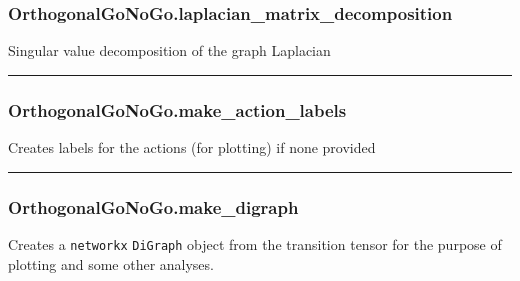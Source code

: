 \subsubsection{OrthogonalGoNoGo.laplacian\_matrix\_decomposition}\label{orthogonalgonogo.laplacian_matrix_decomposition}

\begin{Shaded}
\begin{Highlighting}[]
\NormalTok{)}
\end{Highlighting}
\end{Shaded}

Singular value decomposition of the graph Laplacian

\begin{center}\rule{0.5\linewidth}{\linethickness}\end{center}

\subsubsection{OrthogonalGoNoGo.make\_action\_labels}\label{orthogonalgonogo.make_action_labels}

\begin{Shaded}
\begin{Highlighting}[]
\NormalTok{)}
\end{Highlighting}
\end{Shaded}

Creates labels for the actions (for plotting) if none provided

\begin{center}\rule{0.5\linewidth}{\linethickness}\end{center}

\subsubsection{OrthogonalGoNoGo.make\_digraph}\label{orthogonalgonogo.make_digraph}

\begin{Shaded}
\begin{Highlighting}[]
\NormalTok{)}
\end{Highlighting}
\end{Shaded}

Creates a \texttt{networkx} \texttt{DiGraph} object from the transition
tensor for the purpose of plotting and some other analyses.

